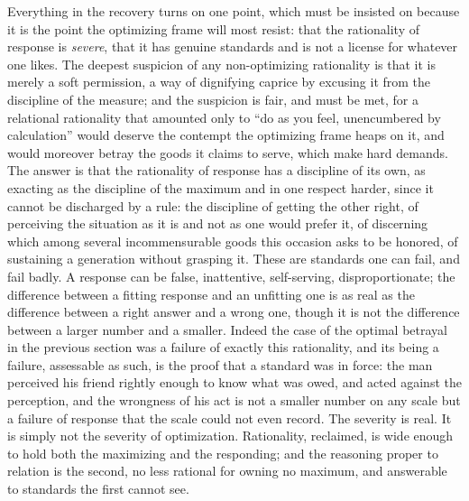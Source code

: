 Everything in the recovery turns on one point, which must be insisted on because it is the point the optimizing frame will most resist: that the rationality of response is \emph{severe}, that it has genuine standards and is not a license for whatever one likes. The deepest suspicion of any non-optimizing rationality is that it is merely a soft permission, a way of dignifying caprice by excusing it from the discipline of the measure; and the suspicion is fair, and must be met, for a relational rationality that amounted only to ``do as you feel, unencumbered by calculation'' would deserve the contempt the optimizing frame heaps on it, and would moreover betray the goods it claims to serve, which make hard demands. The answer is that the rationality of response has a discipline of its own, as exacting as the discipline of the maximum and in one respect harder, since it cannot be discharged by a rule: the discipline of getting the other right, of perceiving the situation as it is and not as one would prefer it, of discerning which among several incommensurable goods this occasion asks to be honored, of sustaining a generation without grasping it. These are standards one can fail, and fail badly. A response can be false, inattentive, self-serving, disproportionate; the difference between a fitting response and an unfitting one is as real as the difference between a right answer and a wrong one, though it is not the difference between a larger number and a smaller. Indeed the case of the optimal betrayal in the previous section was a failure of exactly this rationality, and its being a failure, assessable as such, is the proof that a standard was in force: the man perceived his friend rightly enough to know what was owed, and acted against the perception, and the wrongness of his act is not a smaller number on any scale but a failure of response that the scale could not even record. The severity is real. It is simply not the severity of optimization. Rationality, reclaimed, is wide enough to hold both the maximizing and the responding; and the reasoning proper to relation is the second, no less rational for owning no maximum, and answerable to standards the first cannot see.
